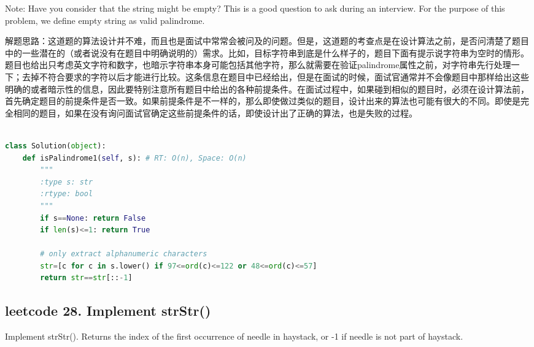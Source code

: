\documentclass[a4paper,10pt]{article}
\begin{document}
\noindent Note: Have you consider that the string might be empty? This is a good question to ask during an interview. For the purpose of this problem, we define empty string as valid palindrome.\\

\begin{CJK*}{UTF8}{gbsn}
\noindent 解题思路：这道题的算法设计并不难，而且也是面试中常常会被问及的问题。但是，这道题的考查点是在设计算法之前，是否问清楚了题目中的一些潜在的（或者说没有在题目中明确说明的）需求。比如，目标字符串到底是什么样子的，题目下面有提示说字符串为空时的情形。题目也给出只考虑英文字符和数字，也暗示字符串本身可能包括其他字符，那么就需要在验证palindrome属性之前，对字符串先行处理一下；去掉不符合要求的字符以后才能进行比较。这条信息在题目中已经给出，但是在面试的时候，面试官通常并不会像题目中那样给出这些明确的或者暗示性的信息，因此要特别注意所有题目中给出的各种前提条件。在面试过程中，如果碰到相似的题目时，必须在设计算法前，首先确定题目的前提条件是否一致。如果前提条件是不一样的，那么即使做过类似的题目，设计出来的算法也可能有很大的不同。即使是完全相同的题目，如果在没有询问面试官确定这些前提条件的话，即使设计出了正确的算法，也是失败的过程。\\
\end{CJK*}

\begin{lstlisting}[language=Python, caption=Problem125. Valid Palindrome]

class Solution(object):
    def isPalindrome1(self, s): # RT: O(n), Space: O(n)
        """
        :type s: str
        :rtype: bool
        """
        if s==None: return False
        if len(s)<=1: return True
        
        # only extract alphanumeric characters
        str=[c for c in s.lower() if 97<=ord(c)<=122 or 48<=ord(c)<=57]
        return str==str[::-1]
\end{lstlisting}


\subsection{leetcode 28. Implement strStr()}
Implement strStr(). Returns the index of the first occurrence of needle in haystack, or -1 if needle is not part of haystack. \\
\end{document}

